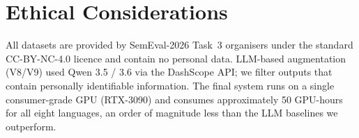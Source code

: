 \documentclass[11pt]{article}
\begin{document}
\section*{Ethical Considerations}

All datasets are provided by SemEval-2026 Task~3 organisers under
the standard CC-BY-NC-4.0 licence and contain no personal data.
LLM-based augmentation (V8/V9) used Qwen 3.5 / 3.6 via the DashScope
API; we filter outputs that contain personally identifiable
information. The final system runs on a single consumer-grade GPU
(RTX-3090) and consumes approximately 50 GPU-hours for all eight
languages, an order of magnitude less than the LLM baselines we
outperform.


% 
\end{document}
